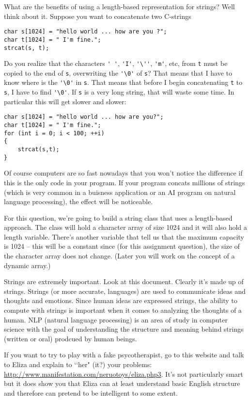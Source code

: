 What are the benefits of using a length-based representation for strings?
Well think about it. Suppose
you want to concatenate two C-strings
{\small
\begin{Verbatim}[frame=single, commandchars = \~\@\!]
char s[1024] = "hello world ... how are you ?";
char t[1024] = " I'm fine.";
strcat(s, t);
\end{Verbatim}
}

Do you realize that the characters \verb!' '!, \verb!'I'!, \verb!'\''!,
\verb!'m'!, etc, from \verb!t! must be copied to the end of \verb!s!,
overwriting
the \verb!'\0'! of \verb!s!? That means that I have to know where is the
\verb!'\0'! in \verb!s!. That means that before I begin
concatenating \verb!t! to \verb!s!, I have to find \verb!'\0'!.
If \verb!s! is a very long string, that will waste some time.
In particular this will get slower and slower:
{\small
\begin{Verbatim}[frame=single, commandchars = \~\@\!]
char s[1024] = "hello world ... how are you?";
char t[1024] = " I'm fine.";
for (int i = 0; i < 100; ++i)
{
    strcat(s,t);
}
\end{Verbatim}
}
Of course computers are so fast nowadays that you won't notice the
difference if this is the only code
in your program. If your program concats millions of strings (which
is very common in a
buisness application or an AI program on natural language processing),
the effect will be noticeable.

For this question, we're going to build a string class that uses a
length-based approach. The class will
hold a character array of size 1024 and it will also hold a length variable.
There's another variable that
tell us that the maximum capacity is 1024 -- this will be a constant since
(for this assignment
question), the size of the character array does not change.
(Later you will work on the concept of a dynamic array.)

Strings are extremely important. Look at this document.
Clearly it's made up of strings. Strings (or more
accurate, languages) are used to communicate ideas and thoughts and emotions.
Since human ideas are expressed
strings, the ability to compute with strings is important when it comes to
analyzing the thoughts of a
human. NLP (natural language processing) is an area of study in computer
science with the goal of
understanding the structure and meaning behind strings (written or oral)
prodcued by human beings.

If you want to try to play with a fake psycotherapist, go to this website and
talk to Eliza and explain to
\lq\lq her" (it?) your problems:
\underline{http://www.manifestation.com/neruotoys/eliza.php3}.
It's not particularly smart
but it does show you that Eliza can at least understand basic English
structure and therefore can
pretend to be intelligent to some extent.

